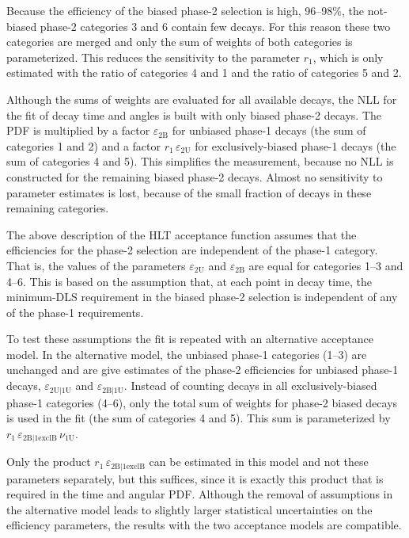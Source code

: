 Because the efficiency of the biased phase-2 selection is high, 96--98\%, the not-biased phase-2 categories 3 and 6 contain few decays. For
this reason these two categories are merged and only the sum of weights of both categories is parameterized. This reduces the sensitivity
to the parameter $r_\text{1}$, which is only estimated with the ratio of categories 4 and 1 and the ratio of categories 5 and 2.

Although the sums of weights are evaluated for all available decays, the NLL for the fit of decay time and angles is built with only biased
phase-2 decays. The PDF is multiplied by a factor $\varepsilon_\text{2B}$ for unbiased phase-1 decays (the sum of categories 1 and 2) and a
factor $r_\text{1}\, \varepsilon_\text{2U}$ for exclusively-biased phase-1 decays (the sum of categories 4 and 5). This simplifies the
measurement, because no NLL is constructed for the remaining biased phase-2 decays. Almost no sensitivity to parameter estimates is lost,
because of the small fraction of decays in these remaining categories.

The above description of the HLT acceptance function assumes that the efficiencies for the phase-2 selection are independent of the phase-1
category. That is, the values of the parameters $\varepsilon_\text{2U}$ and $\varepsilon_\text{2B}$ are equal for categories 1--3 and 4--6.
This is based on the assumption that, at each point in decay time, the minimum-DLS requirement in the biased phase-2 selection is
independent of any of the phase-1 requirements.

To test these assumptions the fit is repeated with an alternative acceptance model. In the alternative model, the unbiased phase-1
categories (1--3) are unchanged and are give estimates of the phase-2 efficiencies for unbiased phase-1 decays, $\varepsilon_\text{2U|1U}$
and $\varepsilon_\text{2B|1U}$. Instead of counting decays in all exclusively-biased phase-1 categories (4--6), only the total sum of
weights for phase-2 biased decays is used in the fit (the sum of categories 4 and 5). This sum is parameterized by
$r_\text{1}\, \varepsilon_\text{2B|1exclB}\, \nu_\text{1U}$.

Only the product $r_\text{1}\, \varepsilon_\text{2B|1exclB}$ can be estimated in this model and not these parameters separately, but this
suffices, since it is exactly this product that is required in the time and angular PDF. Although the removal of assumptions in the
alternative model leads to slightly larger statistical uncertainties on the efficiency parameters, the results with the two acceptance
models are compatible.

